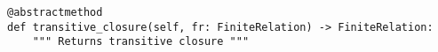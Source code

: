 \begin{verbatim}
@abstractmethod
def transitive_closure(self, fr: FiniteRelation) -> FiniteRelation:
    """ Returns transitive closure """
\end{verbatim}